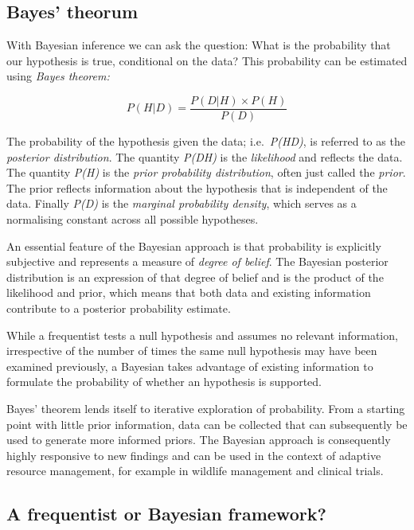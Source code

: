 \documentclass[
]{book}
\begin{document}
\hypertarget{theorum}{%
\subsection{Bayes' theorum}\label{theorum}}

With Bayesian inference we can ask the question: What is the probability that our hypothesis is true, conditional on the data? This probability can be estimated using \emph{Bayes theorem:}

\begin{equation*} 
P(H|D) = \frac{P(D|H) \times P(H)}{P(D)}
\end{equation*}

The probability of the hypothesis given the data; i.e.~\emph{P(H\textbar D)}, is referred to as the \emph{posterior distribution}. The quantity \emph{P(D\textbar H)} is the \emph{likelihood} and reflects the data. The quantity \emph{P(H)} is the \emph{prior probability distribution}, often just called the \emph{prior}. The prior reflects information about the hypothesis that is independent of the data. Finally \emph{P(D)} is the \emph{marginal probability density}, which serves as a normalising constant across all possible hypotheses.

An essential feature of the Bayesian approach is that probability is explicitly subjective and represents a measure of \emph{degree of belief}. The Bayesian posterior distribution is an expression of that degree of belief and is the product of the likelihood and prior, which means that both data and existing information contribute to a posterior probability estimate.

While a frequentist tests a null hypothesis and assumes no relevant information, irrespective of the number of times the same null hypothesis may have been examined previously, a Bayesian takes advantage of existing information to formulate the probability of whether an hypothesis is supported.

Bayes' theorem lends itself to iterative exploration of probability. From a starting point with little prior information, data can be collected that can subsequently be used to generate more informed priors. The Bayesian approach is consequently highly responsive to new findings and can be used in the context of adaptive resource management, for example in wildlife management and clinical trials.

\hypertarget{which}{%
\subsection{A frequentist or Bayesian framework?}\label{which}}
\end{document}
